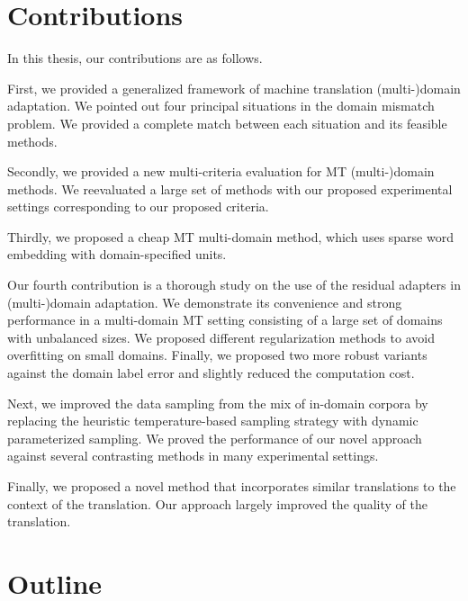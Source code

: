 \section{Contributions}
In this thesis, our contributions are as follows.

First, we provided a generalized framework of machine translation (multi-)domain adaptation. We pointed out four principal situations in the domain mismatch problem. We provided a complete match between each situation and its feasible methods.

Secondly, we provided a new multi-criteria evaluation for MT (multi-)domain methods. We reevaluated a large set of methods with our proposed experimental settings corresponding to our proposed criteria.

Thirdly, we proposed a cheap MT multi-domain method, which uses sparse word embedding with domain-specified units.

Our fourth contribution is a thorough study on the use of the residual adapters in (multi-)domain adaptation. We demonstrate its convenience and strong performance in a multi-domain MT setting consisting of a large set of domains with unbalanced sizes. We proposed different regularization methods to avoid overfitting on small domains. Finally, we proposed two more robust variants against the domain label error and slightly reduced the computation cost.

Next, we improved the data sampling from the mix of in-domain corpora by replacing the heuristic temperature-based sampling strategy with dynamic parameterized sampling. We proved the performance of our novel approach against several contrasting methods in many experimental settings.

Finally, we proposed a novel method that incorporates similar translations to the context of the translation. Our approach largely improved the quality of the translation.

\section{Outline}


